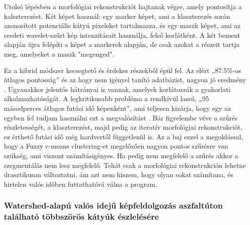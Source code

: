 Utolsó lépésben a morfológiai rekonstrukciót hajtanak végre, amely
pontosítja a kalszterezést. Két képet használ: egy marker képet, ami a
klaszterezés során azonosított potenciális kátyú pixeleket tartalmazza,
és egy maszk képet, ami az eredeti wavelet-szűrt kép intenzitásait
használja, felső korlátként. A két bement alapján újra felépíti a képet
a markerek alapján, de csak azokat a részeit tartja meg, amelyeket a
maszk "megenged". \cite{oumaPotholeDetectionAsphalt2017}

Ez a hibrid módszer kecsegtető és érdekes részekből épül fel. Az elért
„87.5\%-os átlagos pontosság'' és az hogy nem igényel tanító adatbázist,
nagyon jó eredmény \cite{oumaPotholeDetectionAsphalt2017}. Ugyanakkor jelentős hátrányai is vannak,
amelyek korlátozzák a gyakorlati alkalmazhatóságát. A legkritikusabb
probléma a rendkívül lassú, „95 másodperces átlagos futási idő
képenként'', ami teljesen kizárja, hogy egy az egyben fel tudjam
használni ezt a megvalósítást \cite{oumaPotholeDetectionAsphalt2017}. Bár figyelembe véve a szűrés
részletességét, a klaszterezést, majd pedig az iteratív morfológiai
rekonstrukciót, ez érthető futási idő még hardvertől függetlenül is. Az
a baj ezzel a megoldással, hogy a Fuzzy c-means clustering-et megelőzően
nagyon pontos szűrésre van szükség, ami viszont számításigényes. Ha
pedig nem megfelelő a szűrés akkor a szegmentálás nem lesz megfelelő.
Tehát csak a morfológiai rekonstrukción lehetne drasztikusan
változtatni, ám azt nem hiszem, hogy olyan sokat számítana, és hirtelen
valós időben futtathatóvá válna a program.

\subsubsection{Watershed-alapú valós idejű képfeldolgozás aszfaltúton található többszörös kátyúk észlelésére}
\label{watershed-alapu}

